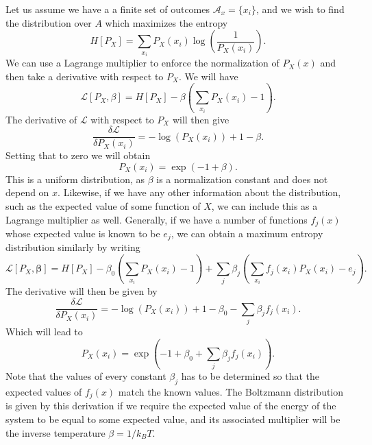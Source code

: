 Let us assume we have a a finite set of outcomes $\mathcal{A}_x = \{x_i\}$, and we wish to find the distribution over $A$ which maximizes the entropy 
\[
H[P_X] = \sum_{x_i} P_X(x_i) \log \left(\frac{1}{P_X(x_i)}\right).
\]
We can use a Lagrange multiplier to enforce the normalization of $P_X(x)$ and then take a derivative with respect to $P_X$. We will have
\[
\mathcal{L}[P_X,\beta] = H[P_X] - \beta \left(\sum_{x_i} P_X(x_i) -1\right).
\]
The derivative of $\mathcal{L}$ with respect to $P_X$ will then give
\[
\frac{\delta \mathcal{L}}{\delta P_X(x_i)} = -\log(P_X(x_i)) + 1 - \beta.
\]
Setting that to zero we will obtain
\[
P_X(x_i) = \exp\left(-1+\beta \right).
\]
This is a uniform distribution, as $\beta$ is a normalization constant and does not depend on $x$. Likewise, if we have any other information about the distribution, such as the expected value of some function of $X$, we can include this as a Lagrange multiplier as well. Generally, if we have a number of functions $f_j(x)$ whose expected value is known to be $e_j$, we can obtain a maximum entropy distribution similarly by writing
\[
\mathcal{L}[P_X,\boldsymbol{\beta}] = H[P_X] - \beta_0 \left(\sum_{x_i} P_X(x_i) -1\right) +  \sum_j \beta_j \left(\sum_{x_i} f_j(x_i) P_X(x_i) -e_j\right).
\]
The derivative will then be given by
\[
\frac{\delta \mathcal{L}}{\delta P_X(x_i)} = -\log(P_X(x_i)) + 1 - \beta_0 - \sum_j \beta_j f_j(x_i).
\]
Which will lead to
\[
P_X(x_i) = \exp\left(-1+\beta_0+\sum_j \beta_j f_j(x_i)\right).
\]
Note that the values of every constant $\beta_j$ has to be determined so that the expected values of $f_j(x)$ match the known values. The Boltzmann distribution is given by this derivation if we require the expected value of the energy of the system to be equal to some expected value, and its associated multiplier will be the inverse temperature $\beta = 1/k_B T$.